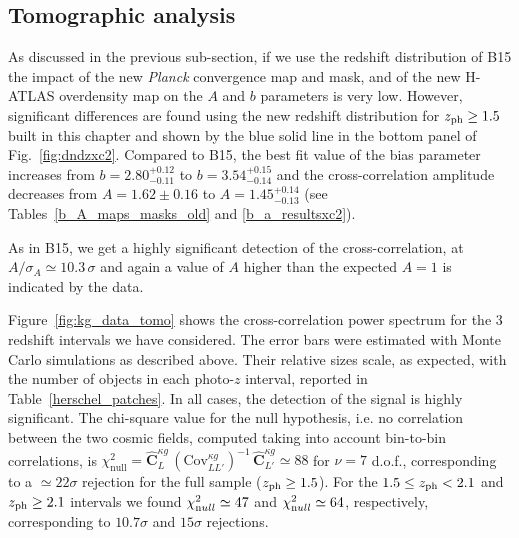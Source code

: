 \subsection{Tomographic analysis}
\label{subsec:tomography}
As discussed in the previous sub-section, {if we use the redshift distribution of B15} the impact of the new \textit{Planck} convergence map and mask, and of the new H-ATLAS overdensity map on the $A$ and $b$ parameters is very low. However, significant differences are found using the new redshift distribution for $z_{\rm{ph}}\ge 1.5$ built in this chapter and shown by the blue solid line in the bottom panel of Fig.~\eqref{fig:dndzxc2}. Compared to B15, the best fit value of the bias parameter increases from $b=2.80^{+0.12}_{-0.11}$  to $b=3.54^{+0.15}_{-0.14}$ and the cross-correlation amplitude decreases from  $A = 1.62 \pm 0.16$  to $A = 1.45^{+0.14}_{-0.13}$ (see Tables~\eqref{b_A_maps_masks_old} and \eqref{b_a_resultsxc2}).


As in B15, we get a highly significant detection of the cross-correlation, at $A/\sigma_A\simeq 10.3\, \sigma$ and again a value of $A$ higher than the expected $A=1$ is indicated by the data.

Figure~\eqref{fig:kg_data_tomo} shows the cross-correlation power spectrum for the 3 redshift intervals we have considered. The error bars were estimated with Monte Carlo simulations as described above. Their relative sizes scale, as expected, with the number of objects in each photo-$z$ interval, reported in Table~\eqref{herschel_patches}. In all cases, the detection of the signal is highly significant. The chi-square value for the null hypothesis, i.e. no correlation between the two cosmic fields, computed taking into account bin-to-bin correlations, is $\chi_{\text{null}}^2 = \hat{\mathbf{C}}^{\kappa g}_{L} \,(\text{Cov}^{\kappa g}_{LL'})^{-1}\, \hat{\mathbf{C}}^{\kappa g}_{L'} \simeq 88$ for $\nu=7$ d.o.f., corresponding to a $\simeq 22\sigma$ rejection for the full sample ($z_{\rm{ph}} \ge 1.5$). For the $1.5 \le z_{\rm{ph}} < 2.1$ and $z_{\rm{ph}} \ge 2.1$ intervals we found $\chi^2_{\rm null} \simeq 47$ and $\chi^2_{\rm null} \simeq 64$, respectively, corresponding to  $10.7\sigma$ and $15\sigma$ rejections.

